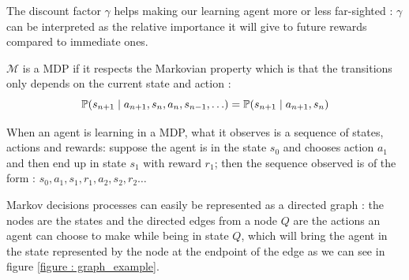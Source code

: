 \documentclass[14pt,a4paper]{article}
\theoremstyle{definition}
\begin{document}
The discount factor $\gamma $ helps making our learning agent more or less far-sighted : $\gamma$ can be interpreted as the relative importance it will give to future rewards compared to immediate ones.

$\mathcal{M}$ is a MDP if it respects the Markovian property which is that the transitions only depends on the current state and action : 
\begin{equation*}
\mathbb{P}(s_{n+1}\mid a_{n+1},s_{n},a_{n},s_{n-1},\ldots)=\mathbb{P}(s_{n+1}\mid a_{n+1},s_{n})\\
\end{equation*}


When an agent is learning in a MDP, what it observes is a sequence of states, actions and rewards: suppose the agent is in the state $s_0$ and chooses action $a_1$ and then end up in state $s_1$ with reward $r_1$; then the sequence observed is of the form : $s_0,a_1,s_1,r_1,a_2,s_2,r_2\ldots$


Markov decisions processes can easily be  represented as a directed graph : the nodes are the states and the directed edges from a node $Q$ are the actions an agent can choose to make while being in state $Q$, which will bring the agent in the state represented by the node at the endpoint of the edge as we can see in figure \ref{figure : graph_example}.
\end{document}
